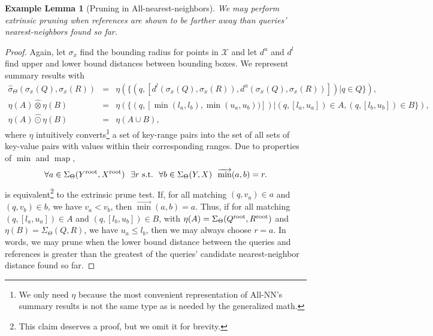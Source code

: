 \documentclass{article}
\newtheorem{examplelemma} {Example Lemma}
\newcommand{\killspace}{\vspace{-0.08in}}
\newcommand{\GNP}[1][\psi]{{#1}_{\Theta}}
\newcommand{\sigmahat}{\mathbin{\widehat{\sigma}}}
\newcommand{\otimeshat}{\mathbin{\widehat{\otimes}}}
\newcommand{\odothat}{\mathbin{\widehat{\odot}}}
\DeclareMathOperator*{\map}{map}
\newcommand{\st}{{\rm~s.t.~}}
\newcommand{\disthrectmin}{d^{l}}
\newcommand{\disthrectmax}{d^{u}}
\newcommand{\kdroot}[1]{#1^{\text{\rm root}}}
\newcommand{\kdleft}[1]{#1^{\!L}}
\newcommand{\kdright}[1]{#1^{\!R}}
\begin{document}
\begin{examplelemma}[Pruning in All-nearest-neighbors]\label{lem:allnn}
  We may perform extrinsic pruning when references are shown to be
  farther away than queries' nearest-neighbors found so far.
\end{examplelemma}
\killspace
\begin{proof}
  Again, let $\sigma_x$ find the bounding radius for points in $\mathcal{X}$ and let $\disthrectmax$ and $\disthrectmin$ find upper and lower bound distances between bounding boxes.
  We represent summary results with
  \begin{eqnarray*}
    \GNP[\sigmahat](\sigma_x(Q),\sigma_x(R)) & = & \eta(\{(q,[\disthrectmin(\sigma_x(Q),\sigma_x(R)), \disthrectmax(\sigma_x(Q),\sigma_x(R))]) | q \in Q\}), \\
    \eta(A) \otimeshat \eta(B) & = & \eta(\{(q,[\min(l_a,l_b),\min(u_a,u_b))]) | (q,[l_a,u_a]) \in A, (q,[l_b,u_b]) \in B\}), \\
    \eta(A) \odothat \eta(B) & = & \eta(A \cup B),
  \end{eqnarray*}
  where $\eta$ intuitively converts\footnote{We only need $\eta$
  because the most convenient representation of All-NN's summary
  results is not the same type as is needed by the generalized math.}
  a set of key-range pairs into the set of all sets of key-value pairs
  with values within their corresponding ranges.  Due to properties of
  $\min$ and $\map$,
  \[
  \forall a \in \GNP[\Sigma](\kdroot{Y},\kdroot{X})~~ \exists r \st~ \forall b \in \GNP[\Sigma](Y,X)~~ \overrightarrow{\min}(a,b) = r.
  \]
  is equivalent\footnote{This claim deserves a proof, but we omit it
  for brevity.} to the extrinsic prune test.  If, for all matching
  $(q,v_a) \in a$ and $(q,v_b) \in b$, we have $v_a < v_b$, then
  $\overrightarrow{\min}(a,b) = a$.  Thus, if for all matching
  $(q,[l_a,u_a]) \in A$ and $(q,[l_b,u_b]) \in B$, with $\eta(A) =
  \GNP[\Sigma](\kdroot{Q},\kdroot{R})$ and $\eta(B) = \GNP[\Sigma](Q,R)$,
  we have $u_a \leq l_b$, then we may always choose $r = a$.  In
  words, we may prune when the lower bound distance between the
  queries and references is greater than the greatest of the queries'
  candidate nearest-neighbor distance found so far.
\end{proof}
\end{document}
